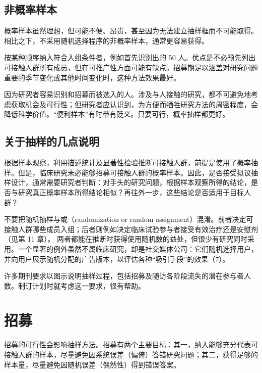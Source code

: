 \subsection{非概率样本}
概率样本虽然理想，但可能不便、昂贵，甚至因为无法建立抽样框而不可能取得。相比之下，不采用随机选择程序的非概率样本，通常更容易获得。
\begin{description}[leftmargin=2em,labelindent=0pt,style=nextline]
\item[连续样本（consecutive sample）。]按某种顺序纳入符合入组条件者，例如首先识别出的 50 人。优点是不必预先列出可接触人群所有成员，但在可推广性方面可能有缺点。招募期足以涵盖对研究问题重要的季节变化或其他时间变化时，这种方法效果最好。
\item[便利样本（convenience sample）。]因为研究者容易识别和招募而被选入的人。涉及与人接触的研究，都不可避免地考虑获取机会及可行性；但研究者应认识到，为方便而牺牲研究方法的周密程度，会降低科学价值。“便利样本”有时带有贬义。只要可行，概率抽样都更好。
\end{description}

\subsection{关于抽样的几点说明}
根据样本观察，利用描述统计及显著性检验推断可接触人群，前提是使用了概率抽样。但是，临床研究未必能够招募可接触人群的概率样本。因此，是否接受拟议抽样设计，通常需要研究者判断：对手头的研究问题，根据样本观察所得的结论，是否与研究真正概率样本所得结论相似？再往外一步，这些结论是否适用于目标人群？

不要把随机抽样与或（randomization or random assignment）混淆。前者决定可接触人群哪些成员入组；后者则例如决定临床试验参与者接受有效治疗还是安慰剂（见第 11 章）。
两者都能在推断时获得使用随机数的益处，但很少有研究同时采用。一个显著的例外虽然不属临床研究，却是社交媒体公司：它们随机选择用户，并向用户展示随机分配的广告版本，以评估各种“吸引手段”的效果（7）。

许多期刊要求以图示说明抽样过程，包括招募及随访各阶段流失的潜在参与者人数。制订计划时就考虑这一要求，很有帮助。

\section{招募}
招募的可行性会影响抽样方法。招募有两个主要目标：其一，纳入能够充分代表可接触人群的样本，尽量避免因系统误差（偏倚）答错研究问题；其二，获得足够的样本量，尽量避免因随机误差（偶然性）得到错误答案。


